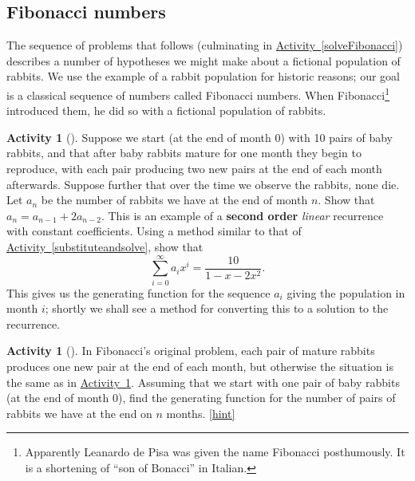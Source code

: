 \documentclass[10pt,]{book}
\newcommand{\terminology}[1]{\textbf{#1}}
\theoremstyle{plain}
\theoremstyle{definition}
\theoremstyle{definition}
\theoremstyle{definition}
\newtheorem{activity}[project]{Activity}
\numberwithin{equation}{chapter}
\begin{document}
\subsection[{Fibonacci numbers}]{Fibonacci numbers}\label{subsection-37}
\hypertarget{p-1344}{}%
The sequence of problems that follows (culminating in \hyperref[solveFibonacci]{Activity~\ref{solveFibonacci}}) describes a number of hypotheses we might make about a fictional population of rabbits. We use the example of a rabbit population for historic reasons; our goal is a classical sequence of numbers called Fibonacci numbers. When Fibonacci\footnote{Apparently Leanardo de Pisa was given the name Fibonacci posthumously. It is a shortening of ``son of Bonacci'' in Italian.\label{fn-17}} introduced them, he did so with a fictional population of rabbits.%
\begin{activity}[]\label{secondorderintroduction}
\hypertarget{p-1345}{}%
Suppose we start (at the end of month 0) with 10 pairs of baby rabbits, and that after baby rabbits mature for one month they begin to reproduce, with each pair producing two new pairs at the end of each month afterwards. Suppose further that over the time we observe the rabbits, none die. Let \(a_n\) be the number of rabbits we have at the end of month \(n\). Show that \(a_n=a_{n-1} + 2a_{n-2}\). This is an example of a \terminology{second order} \emph{linear} recurrence with constant coefficients. Using a method similar to that of \hyperref[substituteandsolve]{Activity~\ref{substituteandsolve}}, show that%
\begin{equation*}
\sum_{i=0}^\infty a_ix^i = \frac{10}{1-x-2x^2}.
\end{equation*}
This gives us the generating function for the sequence \(a_i\) giving the population in month \(i\); shortly we shall see a method for converting this to a solution to the recurrence.%
\end{activity}
\begin{activity}[]\label{originalFibonacci}
\hypertarget{p-1347}{}%
In Fibonacci's original problem, each pair of mature rabbits produces one new pair at the end of each month, but otherwise the situation is the same as in \hyperref[secondorderintroduction]{Activity~\ref{secondorderintroduction}}.  Assuming that we start with one pair of baby rabbits (at the end of month 0), find the generating function for the number of pairs of rabbits we have at the end on \(n\) months.%
\hfill{\tiny\hyperlink{a-261}{[hint]}\hypertarget{q-261}{}}\end{activity}
\end{document}
